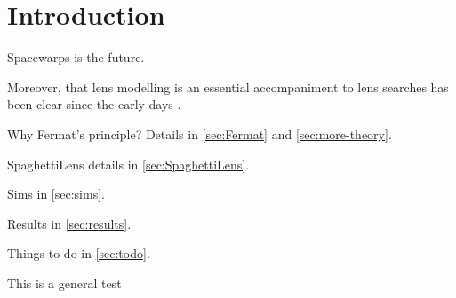 \section{Introduction}

Spacewarps is the future.\todocit

Moreover, that lens modelling is an essential accompaniment to lens
searches has been clear since the early days \citep{1981ApJ...244..723Y}.

Why Fermat's principle?  Details in \ref{sec:Fermat} and
\ref{sec:more-theory}.

SpaghettiLens details in \ref{sec:SpaghettiLens}.

Sims in \ref{sec:sims}.

Results in \ref{sec:results}.

Things to do in \ref{sec:todo}.

This is a general test 

\hline


